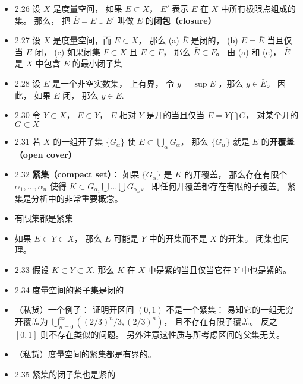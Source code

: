 \begin{itemize}
\item 2.26 设 $X$ 是度量空间， 如果 $E \subset X$， $E'$ 表示 $E$ 在 $X$ 中所有极限点组成的集。 那么， 把 $\bar E = E \cup E'$ 叫做 $E$ 的\textbf{闭包（closure）}

\item 2.27 设 $X$ 是度量空间，而 $E \subset X$， 那么 (a) $\bar E$ 是闭的， (b) $E = \bar E$ 当且仅当 $E$ 闭， (c) 如果闭集 $F \subset X$ 且 $E \subset F$， 那么 $\bar E \subset F$。 由 (a) 和 (c)， $\bar E$ 是 $X$ 中包含 $E$ 的最小闭子集

\item 2.28 设 $E$ 是一个非空实数集， 上有界， 令 $y = \sup E$ ，那么 $y \in \bar E$。
因此， 如果 $E$ 闭， 那么 $y \in E$.

\item 2.30 令 $Y \subset X$， $E \subset Y$， $E$ 相对 $Y$ 是开的当且仅当 $E = Y \bigcap G$， 对某个开的 $G \subset X$

\item 2.31 若 $X$ 的一组开子集 $\{G_\alpha\}$ 使 $E \subset \bigcup_\alpha G_\alpha$， 那么 $\{G_\alpha\}$ 就是 $E$ 的\textbf{开覆盖（open cover）}

\item 2.32 \textbf{紧集（compact set）}： 如果 $\{G_\alpha\}$ 是 $K$ 的开覆盖， 那么存在有限个 $\alpha_1,\dots, \alpha_n$ 使得 $K \subset G_{\alpha_1} \bigcup \dots \bigcup G_{\alpha_n}$。 即任何开覆盖都存在有限的子覆盖。 紧集是分析中的非常重要概念。

\item 有限集都是紧集

\item 如果 $E \subset Y \subset X$， 那么 $E$ 可能是 $Y$ 中的开集而不是 $X$ 的开集。 闭集也同理。

\item 2.33 假设 $K \subset Y \subset X$. 那么 $K$ 在 $X$ 中是紧的当且仅当它在 $Y$ 中也是紧的。

\item 2.34 度量空间的紧子集是闭的

\item （私货）一个例子： 证明开区间 $(0,1)$ 不是一个紧集： 易知它的一组无穷开覆盖为 $\bigcup_{n=0}^{\infty}((2/3)^n/3, (2/3)^n)$， 且不存在有限子覆盖。 反之 $[0,1]$ 则不存在类似的问题。 另外注意这性质与所考虑区间的父集无关。

\item （私货）度量空间的紧集都是有界的。

\item 2.35 紧集的闭子集也是紧的


\end{itemize}
